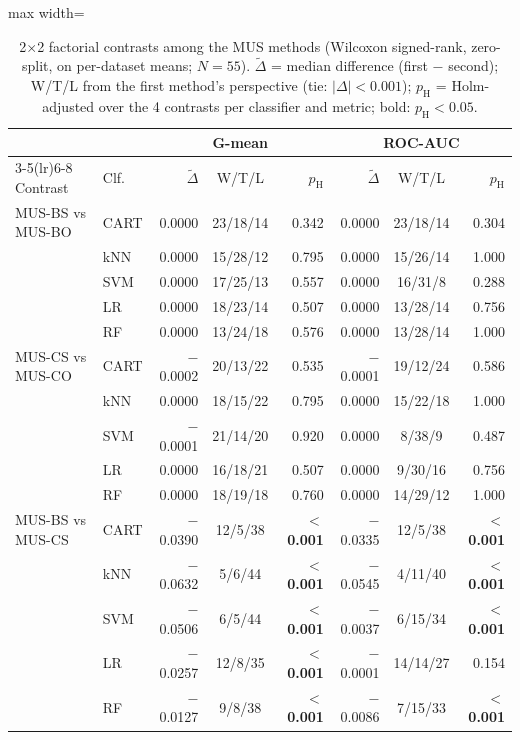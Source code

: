 \begin{table}[!htbp]
\centering
\caption{2$\times$2 factorial contrasts among the MUS methods (Wilcoxon signed-rank, zero-split, on per-dataset means; $N=55$). $\tilde\Delta$ = median difference (first $-$ second); W/T/L from the first method's perspective (tie: $|\Delta|<0.001$); $p_\mathrm{H}$ = Holm-adjusted over the 4 contrasts per classifier and metric; bold: $p_\mathrm{H}<0.05$.}
\label{tab:factorial}
\scriptsize
\setlength{\tabcolsep}{3pt}
\begin{adjustbox}{max width=\linewidth}
\begin{tabular}{llrcrrcr}
\toprule
 & & \multicolumn{3}{c}{G-mean} & \multicolumn{3}{c}{ROC-AUC} \\
\cmidrule(lr){3-5}\cmidrule(lr){6-8}
Contrast & Clf. & $\tilde\Delta$ & W/T/L & $p_\mathrm{H}$ & $\tilde\Delta$ & W/T/L & $p_\mathrm{H}$ \\
\midrule
MUS-BS vs MUS-BO & CART & 0.0000 & 23/18/14 & 0.342 & 0.0000 & 23/18/14 & 0.304 \\
 & kNN & 0.0000 & 15/28/12 & 0.795 & 0.0000 & 15/26/14 & 1.000 \\
 & SVM & 0.0000 & 17/25/13 & 0.557 & 0.0000 & 16/31/8 & 0.288 \\
 & LR & 0.0000 & 18/23/14 & 0.507 & 0.0000 & 13/28/14 & 0.756 \\
 & RF & 0.0000 & 13/24/18 & 0.576 & 0.0000 & 13/28/14 & 1.000 \\
\midrule
MUS-CS vs MUS-CO & CART & $-$0.0002 & 20/13/22 & 0.535 & $-$0.0001 & 19/12/24 & 0.586 \\
 & kNN & 0.0000 & 18/15/22 & 0.795 & 0.0000 & 15/22/18 & 1.000 \\
 & SVM & $-$0.0001 & 21/14/20 & 0.920 & 0.0000 & 8/38/9 & 0.487 \\
 & LR & 0.0000 & 16/18/21 & 0.507 & 0.0000 & 9/30/16 & 0.756 \\
 & RF & 0.0000 & 18/19/18 & 0.760 & 0.0000 & 14/29/12 & 1.000 \\
\midrule
MUS-BS vs MUS-CS & CART & $-$0.0390 & 12/5/38 & \textbf{$<$0.001} & $-$0.0335 & 12/5/38 & \textbf{$<$0.001} \\
 & kNN & $-$0.0632 & 5/6/44 & \textbf{$<$0.001} & $-$0.0545 & 4/11/40 & \textbf{$<$0.001} \\
 & SVM & $-$0.0506 & 6/5/44 & \textbf{$<$0.001} & $-$0.0037 & 6/15/34 & \textbf{$<$0.001} \\
 & LR & $-$0.0257 & 12/8/35 & \textbf{$<$0.001} & $-$0.0001 & 14/14/27 & 0.154 \\
 & RF & $-$0.0127 & 9/8/38 & \textbf{$<$0.001} & $-$0.0086 & 7/15/33 & \textbf{$<$0.001} \\

\end{tabular}
\end{adjustbox}
\end{table}
